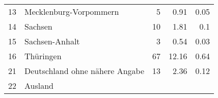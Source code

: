 \begin{longtable}{lXrrr}
     13 &
     \multicolumn{1}{X}{ Mecklenburg-Vorpommern   } &


       \num{5} &
       \num[round-mode=places,round-precision=2]{0,91} &
         \num[round-mode=places,round-precision=2]{0,05} \\

     14 &
     \multicolumn{1}{X}{ Sachsen   } &


       \num{10} &
       \num[round-mode=places,round-precision=2]{1,81} &
         \num[round-mode=places,round-precision=2]{0,1} \\

     15 &
     \multicolumn{1}{X}{ Sachsen-Anhalt   } &


       \num{3} &
       \num[round-mode=places,round-precision=2]{0,54} &
         \num[round-mode=places,round-precision=2]{0,03} \\

     16 &
     \multicolumn{1}{X}{ Thüringen   } &


       \num{67} &
       \num[round-mode=places,round-precision=2]{12,16} &
         \num[round-mode=places,round-precision=2]{0,64} \\

     21 &
     \multicolumn{1}{X}{ Deutschland ohne nähere Angabe   } &


       \num{13} &
       \num[round-mode=places,round-precision=2]{2,36} &
         \num[round-mode=places,round-precision=2]{0,12} \\

     22 &
     \multicolumn{1}{X}{ Ausland   } &



\end{longtable}
